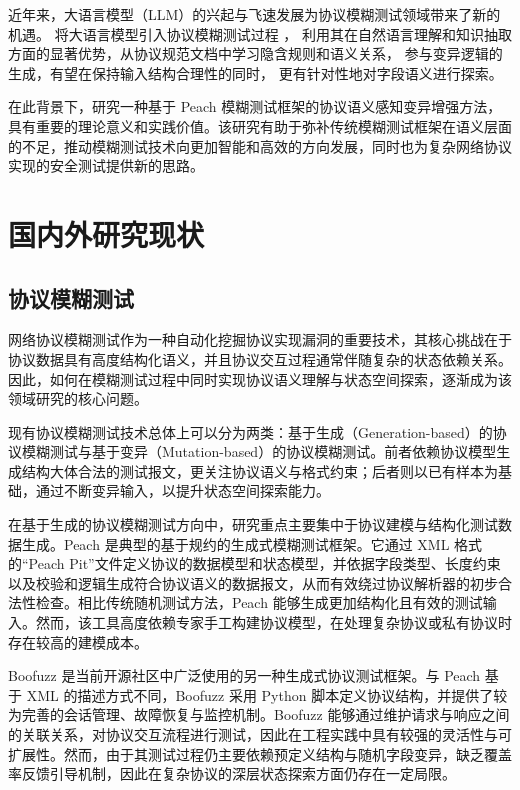 近年来，大语言模型（LLM）的兴起与飞速发展为协议模糊测试领域带来了新的机遇。
将大语言模型引入协议模糊测试过程 \cite{meng2024large, wang2025llmboofuzz}，
利用其在自然语言理解和知识抽取方面的显著优势，从协议规范文档中学习隐含规则和语义关系，
参与变异逻辑的生成，有望在保持输入结构合理性的同时，
更有针对性地对字段语义进行探索。

在此背景下，研究一种基于 Peach 模糊测试框架的协议语义感知变异增强方法，具有重要的理论意义和实践价值。该研究有助于弥补传统模糊测试框架在语义层面的不足，推动模糊测试技术向更加智能和高效的方向发展，同时也为复杂网络协议实现的安全测试提供新的思路。

\section{国内外研究现状}

\subsection{协议模糊测试}

网络协议模糊测试作为一种自动化挖掘协议实现漏洞的重要技术，其核心挑战在于协议数据具有高度结构化语义，并且协议交互过程通常伴随复杂的状态依赖关系。因此，如何在模糊测试过程中同时实现协议语义理解与状态空间探索，逐渐成为该领域研究的核心问题。

现有协议模糊测试技术总体上可以分为两类：基于生成（Generation-based）的协议模糊测试与基于变异（Mutation-based）的协议模糊测试。前者依赖协议模型生成结构大体合法的测试报文，更关注协议语义与格式约束；后者则以已有样本为基础，通过不断变异输入，以提升状态空间探索能力。

在基于生成的协议模糊测试方向中，研究重点主要集中于协议建模与结构化测试数据生成。Peach\cite{gitlab_protocol_fuzzer_ce} 是典型的基于规约的生成式模糊测试框架。它通过 XML 格式的“Peach Pit”文件定义协议的数据模型和状态模型，并依据字段类型、长度约束以及校验和逻辑生成符合协议语义的数据报文，从而有效绕过协议解析器的初步合法性检查。相比传统随机测试方法，Peach 能够生成更加结构化且有效的测试输入。然而，该工具高度依赖专家手工构建协议模型，在处理复杂协议或私有协议时存在较高的建模成本。

Boofuzz\cite{boofuzz} 是当前开源社区中广泛使用的另一种生成式协议测试框架。与 Peach 基于 XML 的描述方式不同，Boofuzz 采用 Python 脚本定义协议结构，并提供了较为完善的会话管理、故障恢复与监控机制。Boofuzz 能够通过维护请求与响应之间的关联关系，对协议交互流程进行测试，因此在工程实践中具有较强的灵活性与可扩展性。然而，由于其测试过程仍主要依赖预定义结构与随机字段变异，缺乏覆盖率反馈引导机制，因此在复杂协议的深层状态探索方面仍存在一定局限。

